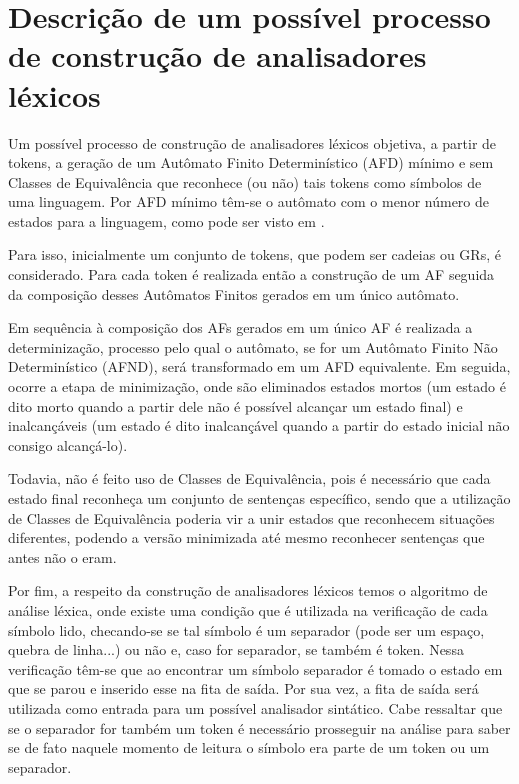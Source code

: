 \documentclass[12pt]{article}
\begin{document}
\section{Descrição de um possível processo de construção de analisadores léxicos}
\label{2}

Um possível processo de construção de analisadores léxicos objetiva, a partir de tokens, a geração de um Autômato Finito Determinístico (AFD) mínimo e sem Classes de Equivalência que reconhece (ou não) tais tokens como símbolos de uma linguagem. Por AFD mínimo têm-se o autômato com o menor número de estados para a linguagem, como pode ser visto em \cite[p.~72]{menezes:00}.

Para isso, inicialmente um conjunto de tokens, que podem ser cadeias ou GRs, é considerado. Para cada token é realizada então a construção de um AF seguida da composição desses Autômatos Finitos gerados em um único autômato. 

Em sequência à composição dos AFs gerados em um único AF é realizada a determinização, processo pelo qual o autômato, se for um Autômato Finito Não Determinístico (AFND), será transformado em um AFD equivalente. Em seguida, ocorre a etapa de minimização, onde são eliminados estados mortos (um estado é dito morto quando a partir dele não é possível alcançar um estado final) e inalcançáveis (um estado é dito inalcançável quando a partir do estado inicial não consigo alcançá-lo).

Todavia, não é feito uso de Classes de Equivalência, pois é necessário que cada estado final reconheça um conjunto de sentenças específico, sendo que a utilização de Classes de Equivalência poderia vir a unir estados que reconhecem situações diferentes, podendo a versão minimizada até mesmo reconhecer sentenças que antes não o eram.

Por fim, a respeito da construção de analisadores léxicos temos o algoritmo de análise léxica, onde existe uma condição que é utilizada na verificação de cada símbolo lido, checando-se se tal símbolo é um separador (pode ser um espaço, quebra de linha...) ou não e, caso for separador, se também é token. Nessa verificação têm-se que ao encontrar um símbolo separador é tomado o estado em que se parou e inserido esse na fita de saída. Por sua vez, a fita de saída será utilizada como entrada para um possível analisador sintático. Cabe ressaltar que se o separador for também um token é necessário prosseguir na análise para saber se de fato naquele momento de leitura o símbolo era parte de um token ou um separador.
\end{document}
